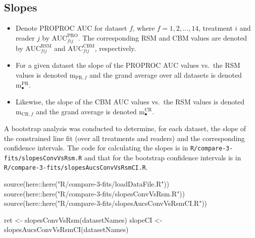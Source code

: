 \documentclass[
]{book}
\newenvironment{Shaded}{\begin{snugshade}}{\end{snugshade}}
\newcommand{\FunctionTok}[1]{\textcolor[rgb]{0.00,0.00,0.00}{#1}}
\newcommand{\NormalTok}[1]{#1}
\newcommand{\OtherTok}[1]{\textcolor[rgb]{0.56,0.35,0.01}{#1}}
\newcommand{\SpecialCharTok}[1]{\textcolor[rgb]{0.00,0.00,0.00}{#1}}
\newcommand{\StringTok}[1]{\textcolor[rgb]{0.31,0.60,0.02}{#1}}
\begin{document}
\hypertarget{rsm-3-fits-slopes}{%
\subsection{Slopes}\label{rsm-3-fits-slopes}}

\begin{itemize}
\item
  Denote PROPROC AUC for dataset \(f\), where \(f=1,2,...,14\), treatment \(i\) and reader \(j\) by \(\text{AUC}^{\text{PRO}}_{fij}\). The corresponding RSM and CBM values are denoted by \(\text{AUC}^{\text{RSM}}_{fij}\) and \(\text{AUC}^{\text{CBM}}_{fij}\), respectively.
\item
  For a given dataset the slope of the PROPROC AUC values vs.~the RSM values is denoted \(\text{m}_{\text{PR},f}\) and the grand average over all datasets is denoted \(\text{m}^{\text{PR}}_\bullet\).
\item
  Likewise, the slope of the CBM AUC values vs.~the RSM values is denoted \(\text{m}_{\text{CR},f}\) and the grand average is denoted \(\text{m}^{\text{CR}}_\bullet\).
\end{itemize}

A bootstrap analysis was conducted to determine, for each dataset, the slope of the constrained line fit (over all treatments and readers) and the corresponding confidence intervals. The code for calculating the slopes is in \texttt{R/compare-3-fits/slopesConvVsRsm.R} and that for the bootstrap confidence intervals is in \texttt{R/compare-3-fits/slopesAucsConvVsRsmCI.R}.

\begin{Shaded}
\begin{Highlighting}[]
\FunctionTok{source}\NormalTok{(here}\SpecialCharTok{::}\FunctionTok{here}\NormalTok{(}\StringTok{"R/compare{-}3{-}fits/loadDataFile.R"}\NormalTok{))}
\FunctionTok{source}\NormalTok{(here}\SpecialCharTok{::}\FunctionTok{here}\NormalTok{(}\StringTok{"R/compare{-}3{-}fits/slopesConvVsRsm.R"}\NormalTok{))}
\FunctionTok{source}\NormalTok{(here}\SpecialCharTok{::}\FunctionTok{here}\NormalTok{(}\StringTok{"R/compare{-}3{-}fits/slopesAucsConvVsRsmCI.R"}\NormalTok{))}

\NormalTok{ret }\OtherTok{\textless{}{-}} \FunctionTok{slopesConvVsRsm}\NormalTok{(datasetNames)}
\NormalTok{slopeCI }\OtherTok{\textless{}{-}} \FunctionTok{slopesAucsConvVsRsmCI}\NormalTok{(datasetNames)}
\end{Highlighting}
\end{Shaded}
\end{document}

